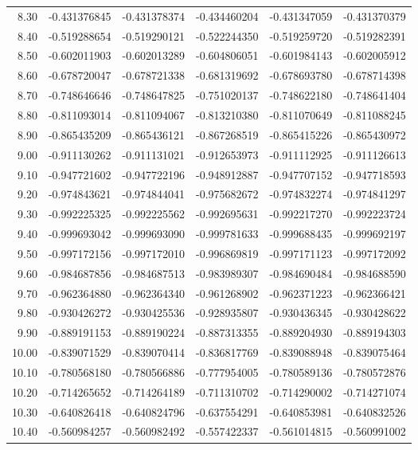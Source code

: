 \documentclass[11pt,a4paper]{article}
\begin{document}
\begin{longtable}{rrrrrr}
8.30 & -0.431376845 & -0.431378374 & -0.434460204 & -0.431347059 & -0.431370379 \\
8.40 & -0.519288654 & -0.519290121 & -0.522244350 & -0.519259720 & -0.519282391 \\
8.50 & -0.602011903 & -0.602013289 & -0.604806051 & -0.601984143 & -0.602005912 \\
8.60 & -0.678720047 & -0.678721338 & -0.681319692 & -0.678693780 & -0.678714398 \\
8.70 & -0.748646646 & -0.748647825 & -0.751020137 & -0.748622180 & -0.748641404 \\
8.80 & -0.811093014 & -0.811094067 & -0.813210380 & -0.811070649 & -0.811088245 \\
8.90 & -0.865435209 & -0.865436121 & -0.867268519 & -0.865415226 & -0.865430972 \\
9.00 & -0.911130262 & -0.911131021 & -0.912653973 & -0.911112925 & -0.911126613 \\
9.10 & -0.947721602 & -0.947722196 & -0.948912887 & -0.947707152 & -0.947718593 \\
9.20 & -0.974843621 & -0.974844041 & -0.975682672 & -0.974832274 & -0.974841297 \\
9.30 & -0.992225325 & -0.992225562 & -0.992695631 & -0.992217270 & -0.992223724 \\
9.40 & -0.999693042 & -0.999693090 & -0.999781633 & -0.999688435 & -0.999692197 \\
9.50 & -0.997172156 & -0.997172010 & -0.996869819 & -0.997171123 & -0.997172092 \\
9.60 & -0.984687856 & -0.984687513 & -0.983989307 & -0.984690484 & -0.984688590 \\
9.70 & -0.962364880 & -0.962364340 & -0.961268902 & -0.962371223 & -0.962366421 \\
9.80 & -0.930426272 & -0.930425536 & -0.928935807 & -0.930436345 & -0.930428622 \\
9.90 & -0.889191153 & -0.889190224 & -0.887313355 & -0.889204930 & -0.889194303 \\
10.00 & -0.839071529 & -0.839070414 & -0.836817769 & -0.839088948 & -0.839075464 \\
10.10 & -0.780568180 & -0.780566886 & -0.777954005 & -0.780589136 & -0.780572876 \\
10.20 & -0.714265652 & -0.714264189 & -0.711310702 & -0.714290002 & -0.714271074 \\
10.30 & -0.640826418 & -0.640824796 & -0.637554291 & -0.640853981 & -0.640832526 \\
10.40 & -0.560984257 & -0.560982492 & -0.557422337 & -0.561014815 & -0.560991002 \\

\end{longtable}
\end{document}
